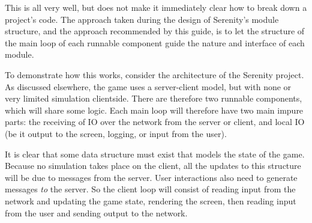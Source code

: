 This is all very well, but does not make it immediately clear how to break down a project's code. The approach taken during the design of Serenity's module structure, and the approach recommended by this guide, is to let the structure of the main loop of each runnable component guide the nature and interface of each module.

To demonstrate how this works, consider the architecture of the Serenity project. As discussed elsewhere, the game uses a server-client model, but with none or very limited simulation clientside. There are therefore two runnable components, which will share some logic. Each main loop will therefore have two main impure parts: the receiving of IO over the network from the server or client, and local IO (be it output to the screen, logging, or input from the user).

It is clear that some data structure must exist that models the state of the game. Because no simulation takes place on the client, all the updates to this structure will be due to messages from the server. User interactions also need to generate messages \emph{to} the server. So the client loop will consist of reading input from the network and updating the game state, rendering the screen, then reading input from the user and sending output to the network.

